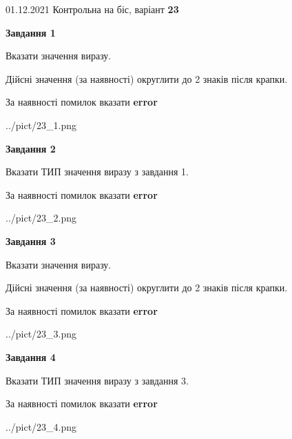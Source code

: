 \documentclass[11pt, ukrainian]{article}
\begin{document}
{01.12.2021 Контрольна на біс, варіант  \No \textbf { 23 }\par}
{
\begin {large}
{\begin {center}\textbf{Завдання 1}\end {center}}\par
Вказати значення виразу. \par
Дійсні значення (за наявності) округлити до 2 знаків після крапки. \par
За наявності помилок вказати \textbf{error}

\begin{center}
	{../pict/23_1.png}
\end{center}
\newpage

{\begin {center}\textbf{Завдання 2}\end {center}}\par
Вказати ТИП значення виразу з завдання 1. \par
За наявності помилок вказати \textbf{error}

\begin{center}
	{../pict/23_2.png}
\end{center}
\newpage

{\begin {center}\textbf{Завдання 3}\end {center}}\par
Вказати значення виразу. \par
Дійсні значення (за наявності) округлити до 2 знаків після крапки. \par
За наявності помилок вказати \textbf{error}

\begin{center}
	{../pict/23_3.png}
\end{center}
\newpage

{\begin {center}\textbf{Завдання 4}\end {center}}\par
Вказати ТИП значення виразу з завдання 3. \par
За наявності помилок вказати \textbf{error}

\begin{center}
	{../pict/23_4.png}
\end{center}
\newpage


\end{large}}
\end{document}
